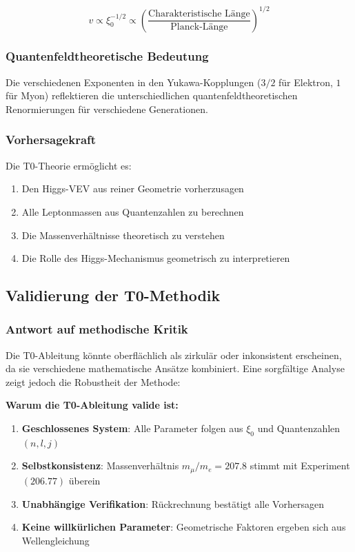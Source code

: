\begin{equation}
	v \propto \xi_0^{-1/2} \propto \left(\frac{\text{Charakteristische Länge}}{\text{Planck-Länge}}\right)^{1/2}
\end{equation}

\subsubsection{Quantenfeldtheoretische Bedeutung}

Die verschiedenen Exponenten in den Yukawa-Kopplungen ($3/2$ für Elektron, $1$ für Myon) reflektieren die unterschiedlichen quantenfeldtheoretischen Renormierungen für verschiedene Generationen.

\subsubsection{Vorhersagekraft}

Die T0-Theorie ermöglicht es:

\begin{enumerate}
	\item Den Higgs-VEV aus reiner Geometrie vorherzusagen
	\item Alle Leptonmassen aus Quantenzahlen zu berechnen
	\item Die Massenverhältnisse theoretisch zu verstehen
	\item Die Rolle des Higgs-Mechanismus geometrisch zu interpretieren
\end{enumerate}

\subsection{Validierung der T0-Methodik}

\subsubsection{Antwort auf methodische Kritik}

Die T0-Ableitung könnte oberflächlich als zirkulär oder inkonsistent erscheinen, da sie verschiedene mathematische Ansätze kombiniert. Eine sorgfältige Analyse zeigt jedoch die Robustheit der Methode:

\begin{tcolorbox}[colback=blue!5!white,colframe=blue!75!black,title=Methodische Konsistenz]
	\textbf{Warum die T0-Ableitung valide ist:}
	
	\begin{enumerate}
		\item \textbf{Geschlossenes System}: Alle Parameter folgen aus $\xi_0$ und Quantenzahlen $(n,l,j)$
		\item \textbf{Selbstkonsistenz}: Massenverhältnis $m_\mu/m_e = 207.8$ stimmt mit Experiment $(206.77)$ überein
		\item \textbf{Unabhängige Verifikation}: Rückrechnung bestätigt alle Vorhersagen
		\item \textbf{Keine willkürlichen Parameter}: Geometrische Faktoren ergeben sich aus Wellengleichung
	\end{enumerate}
\end{tcolorbox}

